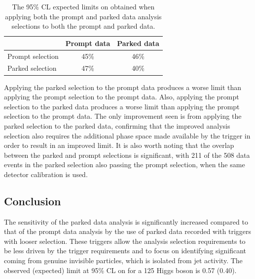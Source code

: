 \begin{table}
  \caption{The 95\% CL expected limits on \BRinv obtained when applying both the prompt and parked data analysis selections to both the prompt and parked data.}
  \label{tab:promptvsparked}
  \begin{tabular}{lcc}
    \hline\hline
    & Prompt data & Parked data \\
    \hline
    Prompt selection & 45\% & 46\% \\
    Parked selection & 47\% & 40\% \\
    \hline\hline
  \end{tabular}
\end{table}

Applying the parked selection to the prompt data produces a worse limit than applying the prompt selection to the prompt data. Also, applying the prompt selection to the parked data produces a worse limit than applying the prompt selection to the prompt data. The only improvement seen is from applying the parked selection to the parked data, confirming that the improved analysis selection also requires the additional phase space made available by the trigger in order to result in an improved limit. It is also worth noting that the overlap between the parked and prompt selections is significant, with 211 of the 508 data events in the parked selection also passing the prompt selection, when the same detector calibration is used.



\subsection{Conclusion}
The sensitivity of the parked data analysis is significantly increased compared to that of the prompt data analysis by the use of parked data recorded with triggers with looser selection. These triggers allow the analysis selection requirements to be less driven by the trigger requirements and to focus on identifying significant \MET coming from genuine invisible particles, which is isolated from jet activity. The observed (expected) limit at 95\% \ac{CL} on \BRinv for a 125 \GeV Higgs boson is 0.57 (0.40).
